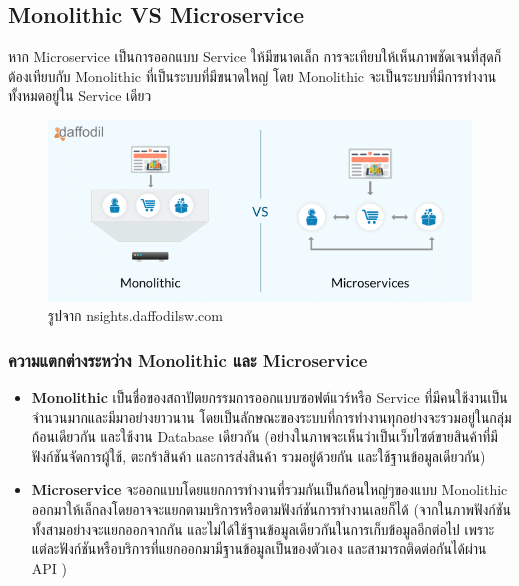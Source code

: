 \subsection{Monolithic VS Microservice}
\hspace{1.27cm}หาก Microservice เป็นการออกแบบ Service ให้มีขนาดเล็ก การจะเทียบให้เห็นภาพชัดเจนที่สุดก็ต้องเทียบกับ Monolithic ที่เป็นระบบที่มีขนาดใหญ่ โดย Monolithic จะเป็นระบบที่มีการทำงานทั้งหมดอยู่ใน Service เดียว
\begin{figure}[H] %
  \centering
  \includegraphics[width=\linewidth, keepaspectratio]{pictures/monolithic-vs-microservices.png}
  \caption[Poem]{รูปจาก nsights.daffodilsw.com}
\end{figure}


\subsubsection{ความแตกต่างระหว่าง Monolithic และ Microservice}
\begin{itemize}
  \item \textbf{Monolithic} เป็นชื่อของสถาปัตยกรรมการออกแบบซอฟต์แวร์หรือ Service ที่มีคนใช้งานเป็นจำนวนมากและมีมาอย่างยาวนาน โดยเป็นลักษณะของระบบที่การทำงานทุกอย่างจะรวมอยู่ในกลุ่มก้อนเดียวกัน และใช้งาน Database เดียวกัน (อย่างในภาพจะเห็นว่าเป็นเว็บไซต์ขายสินค้าที่มีฟังก์ชันจัดการผู้ใช้, ตะกร้าสินค้า และการส่งสินค้า รวมอยู่ด้วยกัน และใช้ฐานข้อมูลเดียวกัน)
  \item \textbf{Microservice}  จะออกแบบโดยแยกการทำงานที่รวมกันเป็นก้อนใหญ่ๆของแบบ Monolithic ออกมาให้เล็กลงโดยอาจจะแยกตามบริการหรือตามฟังก์ชันการทำงานเลยก็ได้ (จากในภาพฟังก์ชันทั้งสามอย่างจะแยกออกจากกัน และไม่ได้ใช้ฐานข้อมูลเดียวกันในการเก็บข้อมูลอีกต่อไป เพราะแต่ละฟังก์ชันหรือบริการที่แยกออกมามีฐานข้อมูลเป็นของตัวเอง และสามารถติดต่อกันได้ผ่าน API )
\end{itemize}




